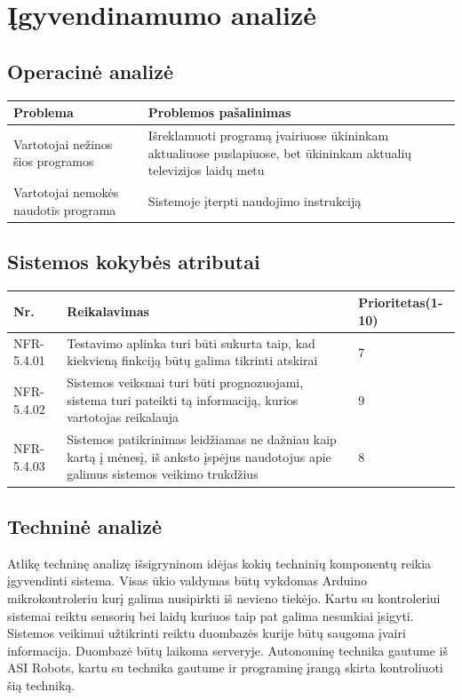 \documentclass[oneside]{VUMIFPSkursinis}
\begin{document}
\section{Įgyvendinamumo analizė}
	\subsection{Operacinė analizė}
\begin{table}[htbp]
	\begin{tabularx}{1\textwidth}{ |P{7.5cm}|X| }  \hline
		Problema & Problemos pašalinimas \\ \hline
		Vartotojai nežinos šios programos & Išreklamuoti programą įvairiuose ūkininkam aktualiuose puslapiuose, bet ūkininkam aktualių televizijos laidų metu \\ \hline
		Vartotojai nemokės naudotis programa & Sistemoje įterpti naudojimo instrukciją \\ \hline
	\end{tabularx}
\end{table}
\subsection{Sistemos kokybės atributai}
\begin{table}[htbp]
	\begin{tabularx}{1\textwidth}{ |P{2.5cm}|X|P{3cm }| }  \hline
		Nr. & Reikalavimas & Prioritetas(1-10) \\ \hline
		NFR-5.4.01 & Testavimo aplinka turi būti sukurta taip, kad kiekvieną finkciją būtų galima tikrinti atskirai & 7 \\ \hline
		NFR-5.4.02 & Sistemos veiksmai turi būti prognozuojami, sistema turi pateikti tą informaciją, kurios vartotojas reikalauja & 9 \\ \hline
		NFR-5.4.03 & Sistemos patikrinimas leidžiamas ne dažniau kaip kartą į mėnesį, iš anksto įspėjus naudotojus apie galimus sistemos veikimo trukdžius  & 8 \\ \hline
	\end{tabularx}
\end{table}
	\subsection{Techninė analizė}
Atlikę techninę analizę išsigryninom idėjas kokių techninių komponentų reikia įgyvendinti sistema. Visas ūkio valdymas būtų vykdomas Arduino mikrokontroleriu kurį galima nusipirkti iš nevieno tiekėjo. Kartu su kontroleriui sistemai reiktu sensorių bei laidų kuriuos taip pat galima nesunkiai įsigyti. Sistemos veikimui užtikrinti reiktu duombazės kurije būtų saugoma įvairi informacija. Duombazė būtų laikoma serveryje. Autonominę technika gautume iš ASI Robots, kartu su technika gautume ir programinę įrangą skirta kontroliuoti šią techniką.
\end{document}
